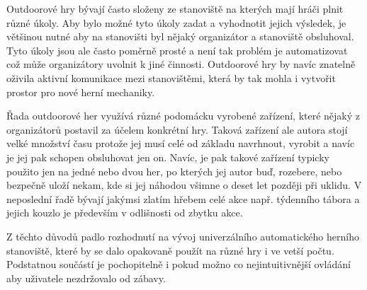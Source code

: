 Outdoorové hry bývají často složeny ze stanoviště na kterých mají hráči plnit různé úkoly.
Aby bylo možné tyto úkoly zadat a vyhodnotit jejich výsledek, je většinou nutné aby na stanovišti byl nějaký organizátor a stanoviště obsluhoval.
Tyto úkoly jsou ale často poměrně prosté a není tak problém je automatizovat což může organizátory uvolnit k jiné činnosti.
Outdoorové hry by navíc znatelně oživila aktivní komunikace mezi stanovištěmi, která by tak mohla i vytvořit prostor pro nové herní mechaniky.

Řada outdoorové her využívá různé podomácku vyrobené zařízení, které nějaký z organizátorů postavil za účelem konkrétní hry.
Taková zařízení ale autora stojí velké množství času protože jej musí celé od základu navrhnout, vyrobit a navíc je jej pak schopen obsluhovat jen on.
Navíc, je pak takové zařízení typicky použito jen na jedné nebo dvou her, po kterých jej autor buď, rozebere, nebo bezpečně uloží nekam, kde si jej náhodou všimne o deset let později při uklidu.
V neposlední řadě bývají jakýmsi zlatím hřebem celé akce např. týdenního tábora a jejich kouzlo je především v odlišnosti od zbytku akce.



Z těchto důvodů padlo rozhodnutí na vývoj univerzálního automatického herního stanoviště, které by se dalo opakovaně použít na různé hry i ve vetší počtu.
Podstatnou součástí je pochopitelně i pokud možno co nejintuitivnější ovládání aby uživatele nezdržovalo od zábavy.





